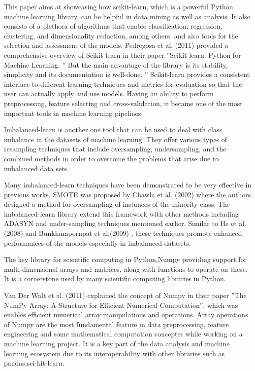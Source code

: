 \documentclass[12pt, a4paper,oneside]{book}
\numberwithin{equation}{section}
\begin{document}
This paper aims at showcasing how scikit-learn, which is a powerful Python machine learning library, can be helpful in data mining as well as analysis. It also consists of a plethora of algorithms that enable classification, regression, clustering, and dimensionality reduction, among others, and also tools for the selection and assessment of the models. Pedregosa et al. (2011) \cite{pedregosa2011scikit} provided a comprehensive overview of Scikit-learn in their paper ”Scikit-learn: Python for Machine Learning. ” But the main advantage of the library is its stability, simplicity and its documentation is well-done. ” Scikit-learn provides a consistent interface to different learning techniques and metrics for evaluation so that the user can actually apply and use models. Having an ability to perform preprocessing, feature selecting and cross-validation, it became one of the most important tools in machine learning pipelines. 

Imbalanced-learn is another one tool that can be used to deal with class imbalance in the datasets of machine learning. They offer various types of resampling techniques that include oversampling, undersampling, and the combined methods in order to overcome the problems that arise due to imbalanced data sets. 

Many imbalanced-learn techniques have been demonstrated to be very effective in previous works. SMOTE was proposed by Chawla et al. (2002) \cite{chawla2002} where the authors designed a method for oversampling of instances of the minority class. The imbalanced-learn library extend this framework with other methods including ADASYN and under-sampling techniques mentioned earlier. Similar to He et al. (2008) \cite{he2008} and Bunkhumpornpat et al.(2009) \cite{bunkhumpornpat2009safe}, these techniques promote enhanced performances of the models especially in imbalanced datasets.

The key library for scientific computing in Python,Numpy providing support for multi-dimensional arrays and matrices, along with functions to operate on these. It is a cornerstone used by many scientific computing libraries in Python.

Van Der Walt et al. (2011) \cite{van2011numpy} explained the concept of Numpy in their paper ”The NumPy Array: A Structure for Efficient Numerical Computation”, which was enables efficient numerical array manipulations and operations. Array operations of Numpy are the most fundamental feature in data preprocessing, feature engineering and some mathematical computation conceptes while working on a machine learning project. It is a key part of the data analysis and machine learning ecosystem due to its interoperability with other libraries such as pandas,sci-kit-learn.
\end{document}
